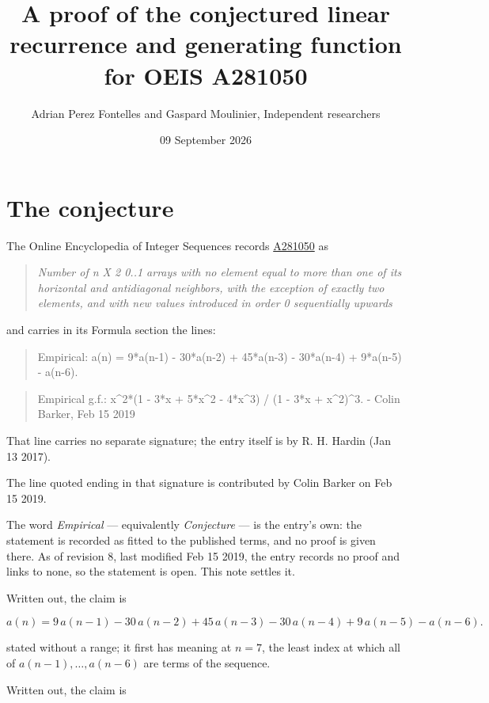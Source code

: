 \documentclass[11pt]{article}
\title{A proof of the conjectured linear recurrence and generating function for OEIS A281050}
\author{Adrian Perez Fontelles and Gaspard Moulinier, Independent researchers}
\date{09 September 2026}
\theoremstyle{definition}
\begin{document}
\maketitle
\section{The conjecture}

The Online Encyclopedia of Integer Sequences records \href{https://oeis.org/A281050}{A281050} as

\begin{quote}\itshape Number of n X 2 0..1 arrays with no element equal to more than one of its horizontal and antidiagonal neighbors, with the exception of exactly two elements, and with new values introduced in order 0 sequentially upwards\end{quote}

and carries in its Formula section the lines:

\begin{quote}\ttfamily Empirical: a(n) = 9*a(n-1) - 30*a(n-2) + 45*a(n-3) - 30*a(n-4) + 9*a(n-5) - a(n-6).\end{quote}

\begin{quote}\ttfamily Empirical g.f.: x\textasciicircum{}2*(1 - 3*x + 5*x\textasciicircum{}2 - 4*x\textasciicircum{}3) / (1 - 3*x + x\textasciicircum{}2)\textasciicircum{}3. - Colin Barker, Feb 15 2019\end{quote}

That line carries no separate signature; the entry itself is by R. H. Hardin (Jan 13 2017).

The line quoted ending in that signature is contributed by Colin Barker on Feb 15 2019.

The word {\itshape Empirical} --- equivalently {\itshape Conjecture} --- is the entry's own: the statement is recorded as fitted to the published terms, and no proof is given there. As of revision 8, last modified Feb 15 2019, the entry records no proof and links to none, so the statement is open. This note settles it.

Written out, the claim is

\[a(n) = 9\,a(n-1) - 30\,a(n-2) + 45\,a(n-3) - 30\,a(n-4) + 9\,a(n-5) - a(n-6).\]

stated without a range; it first has meaning at $n = 7$, the least index at which all of $a(n-1),\dots,a(n-6)$ are terms of the sequence.

Written out, the claim is
\end{document}
